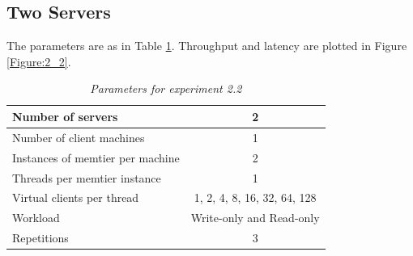 \documentclass[11pt,a4paper]{article}
\begin{document}
\subsection{Two Servers}

The parameters are as in Table \ref{Table:2_2_table}. Throughput and latency are plotted in Figure \ref{Figure:2_2}. 

	\begin{table}[H]
	\centering
		\begin{tabular}{|l|c|}
			\hline Number of servers                					& 2                        \\ 
			\hline Number of client machines        			& 1                        \\ 
			\hline Instances of memtier per machine 		& 2                        \\ 
			\hline Threads per memtier instance     			& 1                        \\
			\hline Virtual clients per thread       				& 1, 2, 4, 8, 16, 32, 64, 128                 \\ 
			\hline Workload                         						& Write-only and Read-only \\
			\hline Repetitions                      						& 3                \\ 
			\hline 
		\end{tabular}
		\caption{\textit{Parameters for experiment 2.2}}
		\label{Table:2_2_table}
	\end{table}
\end{document}
